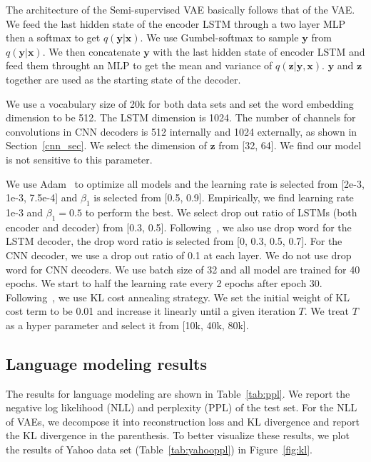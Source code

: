 \documentclass{article}
\begin{document}
The architecture of the Semi-supervised VAE basically follows that of the VAE. We
feed the last hidden state of the encoder LSTM through a two layer MLP then a
softmax to get $q(\mathbf{y}|\mathbf{x})$. We use Gumbel-softmax to
sample $\mathbf{y}$ from $q(\mathbf{y}|\mathbf{x})$. We then concatenate
$\mathbf{y}$ with the last hidden state of encoder LSTM and feed them throught an
MLP to get the mean and variance of $q(\mathbf{z}|\mathbf{y},\mathbf{x})$.
$\mathbf{y}$ and $\mathbf{z}$ together are used as the starting state of the decoder.

We use a vocabulary size of 20k for both data sets and set the word embedding
dimension to be 512. The LSTM dimension is 1024. The number of channels for
convolutions in CNN decoders is 512 internally and 1024 externally,
as shown in Section~\ref{cnn_sec}.
We select the dimension of $\mathbf{z}$ from [32,
64]. We find our model is not sensitive to this parameter.

We use Adam~\cite{kingma2014adam} to optimize all models and the learning rate is selected
from [2e-3, 1e-3, 7.5e-4] and $\beta_{1}$ is selected from [0.5, 0.9]. Empirically, we find
learning rate 1e-3 and $\beta_{1}=0.5$ to perform the best. We select drop out ratio of
LSTMs (both encoder and decoder) from [0.3, 0.5]. Following~\cite{bowman2015generating},
we also use drop word for the LSTM decoder, the drop word ratio is selected from
[0, 0.3, 0.5, 0.7]. For the CNN decoder, we use a drop out ratio of 0.1 at
each layer. We do not use drop word for CNN decoders. We use batch size of 32
and all model are trained for 40 epochs. We start to half the learning rate
every 2 epochs after epoch 30. Following~\cite{bowman2015generating}, we use KL cost
annealing strategy. We set the initial weight of KL cost term to be 0.01 and
increase it linearly until a given iteration $T$. We treat $T$ as a hyper parameter
and select it from [10k, 40k, 80k].

\subsection{Language modeling results}

The results for language modeling are shown in Table~\ref{tab:ppl}. We report
the negative log likelihood (NLL) and perplexity (PPL) of the test set. For the NLL of VAEs,
we decompose it into reconstruction loss and KL divergence and report the
KL divergence in the parenthesis. To better visualize these results, we plot
the results of Yahoo data set (Table~\ref{tab:yahooppl}) in Figure~\ref{fig:kl}.
\end{document}
